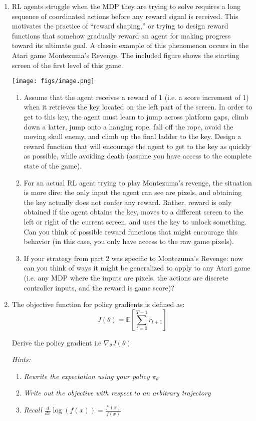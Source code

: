 \documentclass{article}
\begin{document}
\begin{enumerate}

    \item 
    RL agents struggle when the MDP they are trying to solve requires a long sequence of coordinated actions before any reward signal is received. This motivates the practice of “reward shaping,” or trying to design reward functions that somehow gradually reward an agent for making progress toward its ultimate goal. A classic example of this phenomenon occurs in the Atari game Montezuma’s Revenge. The included figure shows the starting screen of the first level of this game.
    
    \texttt{[image: figs/image.png]}
    
    \begin{enumerate}[label=(\alph*)]
        \item Assume that the agent receives a reward of 1 (i.e. a score increment of 1) when it retrieves the key located on the left part of the screen. In order to get to this key, the agent must learn to jump across platform gaps, climb down a latter, jump onto a hanging rope, fall off the rope, avoid the moving skull enemy, and climb up the final ladder to the key. Design a reward function that will encourage the agent to get to the key as quickly as possible, while avoiding death (assume you have access to the complete state of the game).
        \item
        For an actual RL agent trying to play Montezuma’s revenge, the situation is more dire: the only input the agent can see are pixels, and obtaining the key actually does not confer any reward. Rather, reward is only obtained if the agent obtains the key, moves to a different screen to the left or right of the current screen, and uses the key to unlock something. Can you think of possible reward functions that might encourage this behavior (in this case, you only have access to the raw game pixels).
        \item
        If your strategy from part 2 was specific to Montezuma’s Revenge: now can you think of ways it might be generalized to apply to any Atari game (i.e. any MDP where the inputs are pixels, the actions are discrete controller inputs, and the reward is game score)?
    \end{enumerate}

    \item The objective function for policy gradients is defined as: 
    $$J(\theta) = \mathbb{E}[\sum_{t=0}^{T - 1} r_{t+1}]$$
    
    Derive the policy gradient i.e $\nabla_{\theta}J(\theta)$
    
    \textit{Hints:}
    \begin{enumerate}
        \item \textit{Rewrite the expectation using your policy $\pi_{\theta}$}
        \item \textit{Write out the objective with respect to an arbitrary trajectory}
        \item \textit{Recall $\frac{d}{{dx}}\log \left(f(x) \right) = \frac{f'(x)}{f(x)}$}
        
    \end{enumerate}
\end{enumerate}
\end{document}
